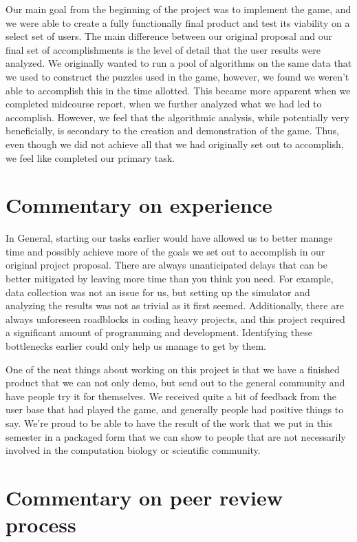 \documentclass[12pt]{article}
\begin{document}
Our main goal from the beginning of the project was to implement the game, and we were able to create a fully functionally final product and test its viability on a select set of users. The main
difference between our original proposal and our final set of accomplishments is the level of detail that the user results were analyzed. We originally wanted to run a pool of algorithms
on the same data that we used to construct the puzzles used in the game, however, we found we weren't able to accomplish this in the time allotted. This became more apparent when we
completed midcourse report, when we further analyzed what we had led to accomplish. However, we feel that the
 algorithmic analysis, while potentially very beneficially, is secondary to the creation and demonstration of the game. Thus, even though we did not achieve all that we had originally set out to
  accomplish, we feel like completed our primary task.

\section*{Commentary on experience}

In General, starting our tasks earlier would have allowed us to better manage time and possibly achieve more of the goals we set out to accomplish in our original project proposal.
There are always unanticipated delays that can be better mitigated by leaving more time than you think you need. For example, data collection was not an issue for us, but
setting up the simulator and analyzing the results was not as trivial as it first seemed. Additionally, there are always unforeseen roadblocks in coding heavy projects, and this project
required a significant amount of programming and development. Identifying these bottlenecks earlier could only help us manage to get by them.

One of the neat things about working on this project is that we have a finished product that we can not only demo, but send out to the general community and have people try it for themselves.
We received quite a bit of feedback from the user base that had played the game, and generally people had positive things to say. We're proud to be able to have the result of the work
that we put in this semester in a packaged form that we can show to people that are not necessarily involved in the computation biology or scientific community.

\section*{Commentary on peer review process}
\end{document}
